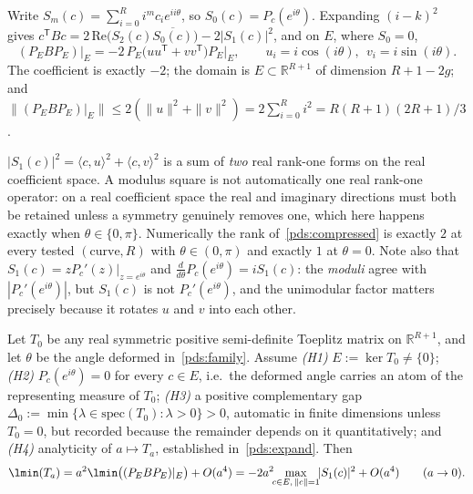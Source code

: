 Write $S_m(c)=\sum_{i=0}^{R}i^{m}c_ie^{ii\theta}$, so $S_0(c)=P_c(e^{i\theta})$. Expanding
$(i-k)^{2}$ gives $c^{\mathsf T}Bc=2\,\mathrm{Re}\bigl(S_2(c)\overline{S_0(c)}\bigr)-2|S_1(c)|^{2}$,
and on $E$, where $S_0=0$,
\begin{equation}\label{pds:compressed}
(P_EBP_E)|_E=-2\,P_E\bigl(uu^{\mathsf T}+vv^{\mathsf T}\bigr)P_E\big|_E,\qquad
u_i=i\cos(i\theta),\ \ v_i=i\sin(i\theta).
\end{equation}
The coefficient is exactly $-2$; the domain is $E\subset\mathbb{R}^{R+1}$ of dimension
$R+1-2g$; and
$\|(P_EBP_E)|_E\|\le2(\|u\|^{2}+\|v\|^{2})=2\sum_{i=0}^{R}i^{2}=R(R+1)(2R+1)/3$.

\begin{remark}\label{pds:rank}
$|S_1(c)|^{2}=\langle c,u\rangle^{2}+\langle c,v\rangle^{2}$ is a sum of \emph{two} real
rank-one forms on the real coefficient space. A modulus square is not automatically one
real rank-one operator: on a real coefficient space the real and imaginary directions must
both be retained unless a symmetry genuinely removes one, which here happens exactly when
$\theta\in\{0,\pi\}$. Numerically the rank of~\eqref{pds:compressed} is exactly $2$ at
every tested $(\text{curve},R)$ with $\theta\in(0,\pi)$ and exactly $1$ at $\theta=0$.
Note also that $S_1(c)=zP_c'(z)|_{z=e^{i\theta}}$ and
$\frac{d}{d\theta}P_c(e^{i\theta})=iS_1(c)$: the \emph{moduli} agree with
$|P_c'(e^{i\theta})|$, but $S_1(c)$ is not $P_c'(e^{i\theta})$, and the unimodular factor
matters precisely because it rotates $u$ and $v$ into each other.
\end{remark}

\begin{theorem}\label{pds:thm}
Let $T_0$ be any real symmetric positive semi-definite Toeplitz matrix on
$\mathbb{R}^{R+1}$, and let $\theta$ be the angle deformed in~\eqref{pds:family}. Assume
\emph{(H1)} $E:=\ker T_0\neq\{0\}$; \emph{(H2)} $P_c(e^{i\theta})=0$ for every $c\in E$,
i.e.\ the deformed angle carries an atom of the representing measure of $T_0$;
\emph{(H3)} a positive complementary gap
$\Delta_0:=\min\{\lambda\in\mathrm{spec}(T_0):\lambda>0\}>0$, automatic in finite dimensions
unless $T_0=0$, but recorded because the remainder depends on it quantitatively; and
\emph{(H4)} analyticity of $a\mapsto T_a$, established in~\eqref{pds:expand}. Then
\begin{equation}\label{pds:law}
\lmin(T_a)=a^{2}\lmin\bigl((P_EBP_E)|_E\bigr)+O(a^{4})
=-2a^{2}\!\!\max_{c\in E,\,\|c\|=1}\!\!|S_1(c)|^{2}+O(a^{4})
\qquad(a\to0).
\end{equation}
\end{theorem}

